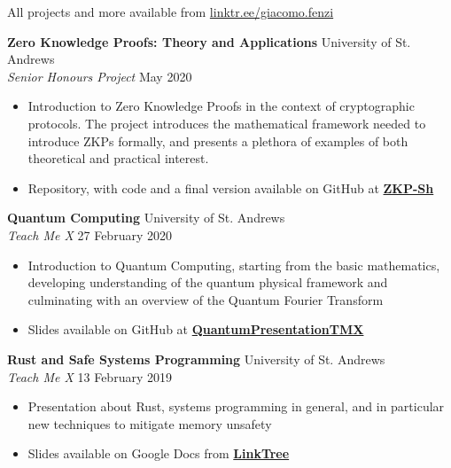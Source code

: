 \documentclass[a4paper]{article}
\begin{document}
All projects and more available from \href{https://linktr.ee/giacomo.fenzi}{\url{linktr.ee/giacomo.fenzi}}

\vspace{5mm}

\textbf{Zero Knowledge Proofs: Theory and Applications} \hfill University of St. Andrews \\
\textit{Senior Honours Project} \hfill{May 2020}
\vspace{-1mm}
\begin{itemize} \itemsep 1pt
    \item Introduction to Zero Knowledge Proofs in the context of cryptographic protocols. The project introduces the mathematical 
    framework needed to introduce ZKPs formally, and presents a plethora of examples of both theoretical and practical interest.
    \item Repository, with code and a final version available on GitHub at \href{https://github.com/WizardOfMenlo/ZKP-Sh}{\textbf{ZKP-Sh}}
\end{itemize}

\textbf{Quantum Computing} \hfill University of St. Andrews \\
\textit{Teach Me X} \hfill{27 February 2020}
\vspace{-1mm}
\begin{itemize} \itemsep 1pt
    \item Introduction to Quantum Computing, starting from the basic mathematics, developing understanding of the quantum physical framework
    and culminating with an overview of the Quantum Fourier Transform
    \item Slides available on GitHub at \href{https://github.com/WizardOfMenlo/QuantumPresentationTMX}{ \textbf{QuantumPresentationTMX}}
\end{itemize}

\textbf{Rust and Safe Systems Programming} \hfill University of St. Andrews \\
\textit{Teach Me X} \hfill{13 February 2019}
\vspace{-1mm}
\begin{itemize} \itemsep 1pt
    \item Presentation about Rust, systems programming in general, and in particular new techniques to mitigate memory unsafety
    \item Slides available on Google Docs from \href{https://docs.google.com/presentation/d/1ui4ByY8qFhqAsdYoyPBPzhyg8AbV5YJKAN9sNwv5QPw/edit?usp=sharing}{\textbf{LinkTree}} 
\end{itemize}
\end{document}
